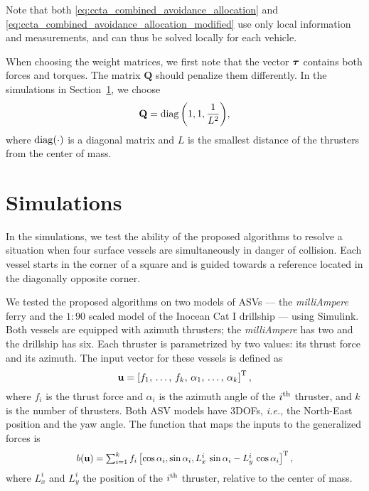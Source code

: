 Note that both \eqref{eq:ccta_combined_avoidance_allocation} and \eqref{eq:ccta_combined_avoidance_allocation_modified} use only local information and measurements, and can thus be solved locally for each vehicle.

When choosing the weight matrices, we first note that the vector $\bm{\tau}$ contains both forces and torques.
The matrix $\mathbf{Q}$ should penalize them differently.
In the simulations in Section~\ref{sec:ccta_simulations}, we choose
\vspace{-1mm}
\begin{equation}
   \mathbf{Q} = \operatorname*{diag}{\left(1,1,\frac{1}{L^2}\right)},
   \label{eq:ccta_Q_matrix}
\end{equation}
where $\operatorname*{diag}(\cdot)$ is a diagonal matrix and $L$ is the smallest distance of the thrusters from the center of mass.

\section{Simulations}
\label{sec:ccta_simulations}
In the simulations, we test the ability of the proposed algorithms to resolve a situation when four surface vessels are simultaneously in danger of collision.
Each vessel starts in the corner of a square and is guided towards a reference located in the diagonally opposite corner.

We tested the proposed algorithms on two models of ASVs --- the \emph{milliAmpere} ferry \cite{pedersen_optimization_2019} and the $1:90$ scaled model of the Inocean Cat I drillship \cite{bjorno_thruster-assisted_2016} --- using Simulink.
Both vessels are equipped with azimuth thrusters; the \emph{milliAmpere} has two and the drillship has six.
Each thruster is parametrized by two values: its thrust force and its azimuth.
The input vector for these vessels is defined as \vspace{-1mm}
\begin{equation}
    \mathbf{u} = \left[ f_1 ,\, \ldots ,\, f_k ,\, \alpha_1 ,\, \ldots ,\, \alpha_k \right]^{\rm T},
\end{equation}
where $f_i$ is the thrust force and $\alpha_i$ is the azimuth angle of the $i^{\rm th}$ thruster, and $k$ is the number of thrusters.
%
Both ASV models have 3DOFs, \emph{i.e.,} the North-East position and the yaw angle.
The function that maps the inputs to the generalized forces is \vspace{-1mm}
\begin{equation}
    \scale[0.93]{b(\mathbf{u}) = \sum_{i=1}^k f_i \left[ \cos\alpha_i, \sin\alpha_i, L_x^i\,\sin\alpha_i - L_y^i\,\cos\alpha_i \right]^{\rm T},}
\end{equation}
where $L_x^i$ and $L_y^i$  the position of the $i^{\rm th}$ thruster, relative to the center of mass.

